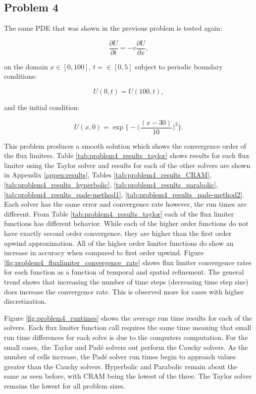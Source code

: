 \clearpage

\subsection{Problem 4}

The same PDE that was shown in the previous problem is tested again:

\begin{equation}
    \frac{\partial U}{\partial t} = -v\frac{\partial U}{\partial x},
    \label{eq:convection_PDE}
\end{equation}

\noindent on the domain $x \in [0, 100]$, $t =\in [0, 5]$ subject to periodic boundary conditions:

\begin{equation}
    U(0,t) = U(100, t),
\end{equation}

\noindent and the initial condition:

\begin{equation}
    U(x,0) = \exp\bigg\{-\bigg(\frac{(x-30)}{10}\bigg)^{2}\bigg\}.
\end{equation}

\noindent This problem produces a smooth solution which shows the convergence order of the flux limiters. Table \ref{tab:problem4_results_taylor} shows results for each flux limiter using the Taylor solver and results for each of the other solvers are shown in Appendix \ref{appen:results}, Tables \ref{tab:problem4_results_CRAM}, \ref{tab:problem4_results_hyperbolic}, \ref{tab:problem4_results_parabolic}, \ref{tab:problem4_results_pade-method1}, \ref{tab:problem4_results_pade-method2}. Each solver has the same error and convergence rate however, the run times are different. From Table \ref{tab:problem4_results_taylor} each of the flux limiter functions has different behavior. While each of the higher order functions do not have exactly second order convergence, they are higher than the first order upwind approximation. All of the higher order limiter functions do show an increase in accuracy when compared to first order upwind. Figure \ref{fig:problem4_fluxlimiter_convergence_rate} shows flux limiter convergence rates for each function as a function of temporal and spatial refinement. The general trend shows that increasing the number of time steps (decreasing time step size) does increase the convergence rate. This is observed more for cases with higher discretization.

Figure \ref{fig:problem4_runtimes} shows the average run time results for each of the solvers. Each flux limiter function call requires the same time meaning that small run time differences for each solve is due to the computers computation. For the small cases, the Taylor and Pad\'e solvers out perform the Cauchy solvers. As the number of cells increase, the Pad\'e solver run times begin to approach values greater than the Cauchy solvers. Hyperbolic and Parabolic remain about the same as seen before, with CRAM being the lowest of the three. The Taylor solver remains the lowest for all problem sizes. 


